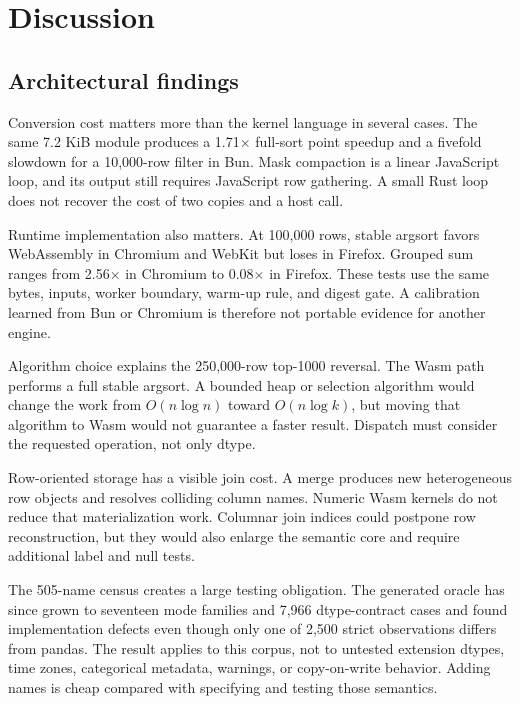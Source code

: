 \documentclass[pdflatex,sn-basic,Numbered]{sn-jnl}
\begin{document}
\section{Discussion}\label{sec:discussion}

\subsection{Architectural findings}

Conversion cost matters more than the kernel language in several cases. The same 7.2 KiB module produces a 1.71$\times$ full-sort point speedup and a fivefold slowdown for a 10,000-row filter in Bun. Mask compaction is a linear JavaScript loop, and its output still requires JavaScript row gathering. A small Rust loop does not recover the cost of two copies and a host call.

Runtime implementation also matters. At 100,000 rows, stable argsort favors WebAssembly in Chromium and WebKit but loses in Firefox. Grouped sum ranges from 2.56$\times$ in Chromium to 0.08$\times$ in Firefox. These tests use the same bytes, inputs, worker boundary, warm-up rule, and digest gate. A calibration learned from Bun or Chromium is therefore not portable evidence for another engine.

Algorithm choice explains the 250,000-row top-1000 reversal. The Wasm path performs a full stable argsort. A bounded heap or selection algorithm would change the work from $O(n\log n)$ toward $O(n\log k)$, but moving that algorithm to Wasm would not guarantee a faster result. Dispatch must consider the requested operation, not only dtype.

Row-oriented storage has a visible join cost. A merge produces new heterogeneous row objects and resolves colliding column names. Numeric Wasm kernels do not reduce that materialization work. Columnar join indices could postpone row reconstruction, but they would also enlarge the semantic core and require additional label and null tests.

The 505-name census creates a large testing obligation. The generated oracle has since grown to seventeen mode families and 7,966 dtype-contract cases and found implementation defects even though only one of 2,500 strict observations differs from pandas. The result applies to this corpus, not to untested extension dtypes, time zones, categorical metadata, warnings, or copy-on-write behavior. Adding names is cheap compared with specifying and testing those semantics.
\end{document}
